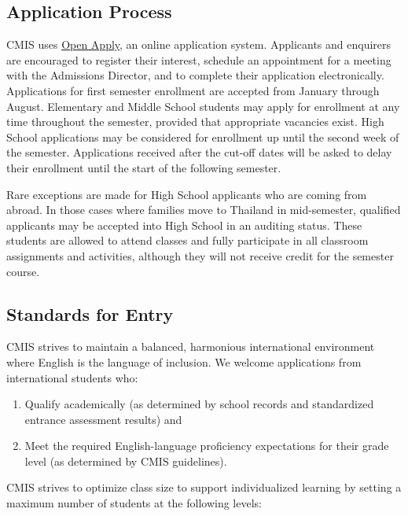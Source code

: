 \subsection{Application Process}

CMIS uses \href{https://cmis.openapply.com/}{Open Apply}, an online application system.  Applicants and enquirers are encouraged to register their interest, schedule an appointment for a meeting with the Admissions Director, and to complete their application electronically.  Applications for first semester enrollment are accepted from January through August.  Elementary and Middle School students may apply for enrollment at any time throughout the semester, provided that appropriate vacancies exist.  High School applications may be considered for enrollment up until the second week of the semester.  Applications received after the cut-off dates will be asked to delay their enrollment until the start of the following semester.  

Rare exceptions are made for High School applicants who are coming from abroad.  In those cases where families move to Thailand in mid-semester, qualified applicants may be accepted into High School in an auditing status.  These students are allowed to attend classes and fully participate in all classroom assignments and activities, although they will not receive credit for the semester course.  

\subsection{Standards for Entry}

CMIS strives to maintain a balanced, harmonious international environment where English is the language of inclusion.  We welcome applications from international students who:
\begin{enumerate}
\item Qualify academically (as determined by school records and standardized entrance assessment results) and
\item Meet the required English-language proficiency expectations for their grade level (as determined by CMIS guidelines).  
\end{enumerate}
CMIS strives to optimize class size to support individualized learning by setting a maximum number of students at the following levels:  


